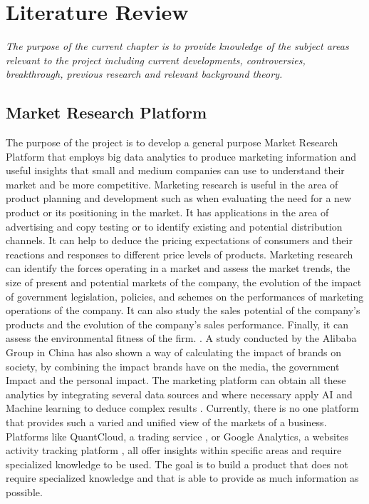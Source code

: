 \newpage
\chapter{Literature Review}

\textsl{The purpose of the current chapter is to provide knowledge of the subject areas relevant to the project including current developments, controversies, breakthrough, previous research and relevant background theory.}


\section{Market Research Platform}
 

The purpose of the project is to develop a general purpose Market Research Platform that employs big data analytics to produce marketing information and useful insights that small and medium companies can use to understand their market and be more competitive. Marketing research is useful in the area of product planning and development such as when evaluating the need for a new product or its positioning in the market. It has applications in the area of advertising and copy testing or to identify existing and potential distribution channels. It can help to deduce the pricing expectations of consumers and their reactions and responses to different price levels of products. Marketing research can identify the forces operating in a market and assess the market trends, the size of present and potential markets of the company, the evolution of the impact of government legislation, policies, and schemes on the performances of marketing operations of the company. It can also study the sales potential of the company’s products and the evolution of the company’s sales performance. Finally, it can assess the environmental fitness of the firm. \cite{marketingresearch}. A study conducted by the Alibaba Group in China has also shown a way of calculating the impact of brands on society, by combining the impact brands have on the media, the government Impact and the personal impact. \cite{brandsimpact} The marketing platform can obtain all these analytics by integrating several data sources and where necessary apply AI and Machine learning to deduce complex results \cite{marketingml}. Currently, there is no one platform that provides such a varied and unified view of the markets of a business. Platforms like QuantCloud, a trading service \cite{quantcloud}, or Google Analytics, a websites activity tracking platform \cite{googleanalytics}, all offer insights within specific areas and require specialized knowledge to be used. The goal is to build a product that does not require specialized knowledge and that is able to provide as much information as possible. 

